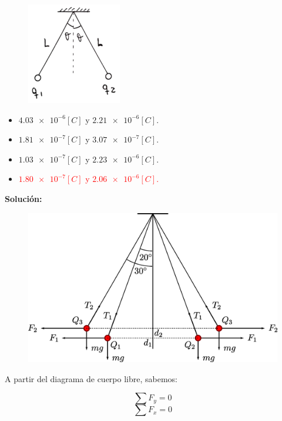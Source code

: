 \documentclass[letter,11pt]{article}
\begin{document}
\begin{enumerate}
\begin{figure}[!h]
\centering
\includegraphics[scale=1.84]{resources/q3.eps}
\end{figure}

\begin{itemize}
    \item $\num{4.03e-6}[C]$ y $\num{2.21e-6}[C]$.
    \item $\num{1.81e-7}[C]$ y $\num{3.07e-7}[C]$.
    \item $\num{1.03e-7}[C]$ y $\num{2.23e-6}[C]$.
    \item \textcolor{red}{$\num{1.80e-7}[C]$ y $\num{2.06e-6}[C]$.}
\end{itemize}

\textbf{Solución:}

\begin{figure}[!h]
\centering
\includegraphics[scale=0.38]{resources/a3.eps}
\end{figure}

A partir del diagrama de cuerpo libre, sabemos:

\begin{equation*}
    \sum F_y = 0
\end{equation*}
\begin{equation*}
    \sum F_x = 0
\end{equation*}


\end{enumerate}
\end{document}
